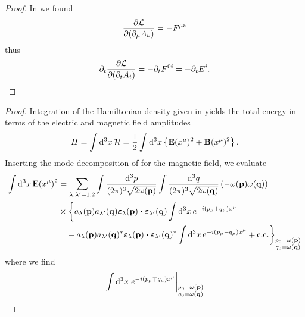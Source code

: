 \mwcoulombcanonicalmomentum
\begin{proof}
	In  we found
	\begin{equation*}
		\pdv{\mathcal{L}}{(\partial_\mu A_\nu)}
		=
		-
		F^{\mu\nu}
	\end{equation*}
	thus
	\begin{equation*}
		\partial_t
		\pdv{\mathcal{L}}{(\partial_tA_i)}
		=
		-
		\partial_t
		F^{0i}
		=
		-
		\partial_t
		E^i
		.
	\end{equation*}
\end{proof}
\mwcoulombenergy
\begin{proof}
	Integration of the Hamiltonian density given in  yields the total energy in terms of the electric and magnetic field amplitudes
	\begin{equation*}
		H
		=
		\int\dd[3]{x}
		\mathcal{H}
		=
		\frac{1}{2}
		\int\dd[3]{x}
		\left\{
			\vb{E}(x^\mu)^2
			+
			\vb{B}(x^\mu)^2
		\right\}
		.
	\end{equation*}
	Inserting the mode decomposition of  for the magnetic field, we evaluate
	\begin{equation*}
		\begin{split}
			\int\dd[3]{x}
			\vb{E}(x^\mu)^2
			&=
			\sum_{\lambda,\lambda^\prime=1,2}
			\int\frac{\dd[3]{p}}{(2\pi)^3\sqrt{2\omega(\vb{p})}}
			\int\frac{\dd[3]{q}}{(2\pi)^3\sqrt{2\omega(\vb{q})}}
			\left(
				-
				\omega(\vb{p})
				\omega(\vb{q})
			\right)
			\\
			&\times
			\biggl\{
				a_\lambda(\vb{p})
				a_{\lambda^\prime}(\vb{q})
				\boldsymbol{\varepsilon}_\lambda(\vb{p})
				\vdot
				\boldsymbol{\varepsilon}_{\lambda^\prime}(\vb{q})
				\int\dd[3]{x}
				e^{-i(p_\mu+q_\mu)x^\mu}
				\\
				& \ \ \
				-
				a_\lambda(\vb{p})
				a_{\lambda^\prime}(\vb{q})^*
				\boldsymbol{\varepsilon}_\lambda(\vb{p})
				\vdot
				\boldsymbol{\varepsilon}_{\lambda^\prime}(\vb{q})^*
				\int\dd[3]{x}
				e^{-i(p_\mu-q_\mu)x^\mu}
				+
				\text{c.c.}
			\biggr\}_{\substack{p_0=\omega(\vb{p})\\q_0=\omega(\vb{q})}}
		\end{split}
	\end{equation*}
	where we find
	\begin{equation*}
		\begin{split}
			\int\dd[3]{x}
			\eval{e^{-i(p_\mu\mp q_\mu)x^\mu}}_{\substack{p_0=\omega(\vb{p})\\q_0=\omega(\vb{q})}}

\end{split}
\end{equation*}
\end{proof}

